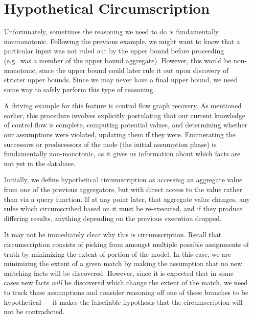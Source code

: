 \section{Hypothetical Circumscription}
\label{sec:hypcirc}
Unfortunately, sometimes the reasoning we need to do is fundamentally nonmonotonic.
Following the previous example, we might want to know that a particular input was not ruled out by the upper bound before proceeding (e.g.\ was a member of the upper bound aggregate).
However, this would be non-monotonic, since the upper bound could later rule it out upon discovery of stricter upper bounds.
Since we may never have a final upper bound, we need some way to safely perform this type of reasoning.

A driving example for this feature is control flow graph recovery.
As mentioned earlier, this procedure involves explicitly postulating that our current knowledge of control flow is complete, computing potential values, and determining whether our assumptions were violated, updating them if they were.
Enumerating the successors or predecessors of the node (the initial assumption phase) is fundamentally non-monotonic, as it gives us information about which facts are not yet in the database.

Initially, we define hypothetical circumscription as accessing an aggregate value from one of the previous aggregators, but with direct access to the value rather than via a query function.
If at any point later, that aggregate value changes, any rules which circumscribed based on it must be re-executed, and if they produce differing results, anything depending on the previous execution dropped.

It may not be immediately clear why this is circumscription.
Recall that circumscription consists of picking from amongst multiple possible assignments of truth by minimizing the extent of portion of the model.
In this case, we are minimizing the extent of a given match by making the assumption that no new matching facts will be discovered.
However, since it is expected that in some cases new facts \emph{will} be discovered which change the extent of the match, we need to track these assumptions and consider reasoning off one of these branches to be hypothetical --- it makes the falsefiable hypothesis that the circumscription will not be contradicted.


